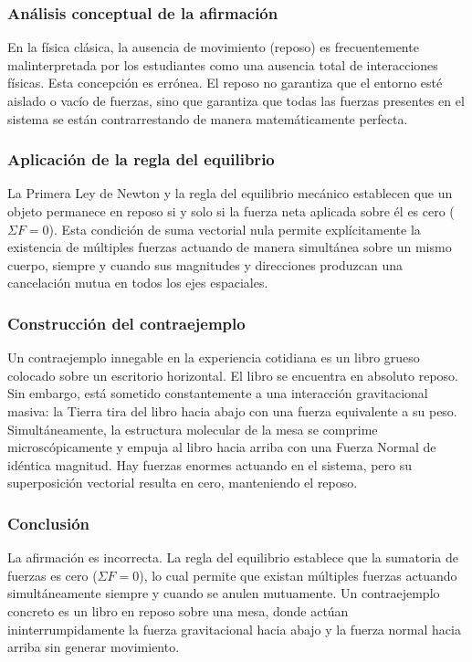 \documentclass[12pt, a4paper]{article}
\begin{document}
\subsubsection*{Análisis conceptual de la afirmación}
En la física clásica, la ausencia de movimiento (reposo) es frecuentemente malinterpretada por los estudiantes como una ausencia total de interacciones físicas. Esta concepción es errónea. El reposo no garantiza que el entorno esté aislado o vacío de fuerzas, sino que garantiza que todas las fuerzas presentes en el sistema se están contrarrestando de manera matemáticamente perfecta. 

\subsubsection*{Aplicación de la regla del equilibrio}
La Primera Ley de Newton y la regla del equilibrio mecánico establecen que un objeto permanece en reposo si y solo si la fuerza neta aplicada sobre él es cero ($\Sigma F = 0$). Esta condición de suma vectorial nula permite explícitamente la existencia de múltiples fuerzas actuando de manera simultánea sobre un mismo cuerpo, siempre y cuando sus magnitudes y direcciones produzcan una cancelación mutua en todos los ejes espaciales.

\subsubsection*{Construcción del contraejemplo}
Un contraejemplo innegable en la experiencia cotidiana es un libro grueso colocado sobre un escritorio horizontal. El libro se encuentra en absoluto reposo. Sin embargo, está sometido constantemente a una interacción gravitacional masiva: la Tierra tira del libro hacia abajo con una fuerza equivalente a su peso. Simultáneamente, la estructura molecular de la mesa se comprime microscópicamente y empuja al libro hacia arriba con una Fuerza Normal de idéntica magnitud. Hay fuerzas enormes actuando en el sistema, pero su superposición vectorial resulta en cero, manteniendo el reposo.

\subsubsection*{Conclusión}
La afirmación es incorrecta. La regla del equilibrio establece que la sumatoria de fuerzas es cero ($\Sigma F = 0$), lo cual permite que existan múltiples fuerzas actuando simultáneamente siempre y cuando se anulen mutuamente. Un contraejemplo concreto es un libro en reposo sobre una mesa, donde actúan ininterrumpidamente la fuerza gravitacional hacia abajo y la fuerza normal hacia arriba sin generar movimiento.
\end{document}
